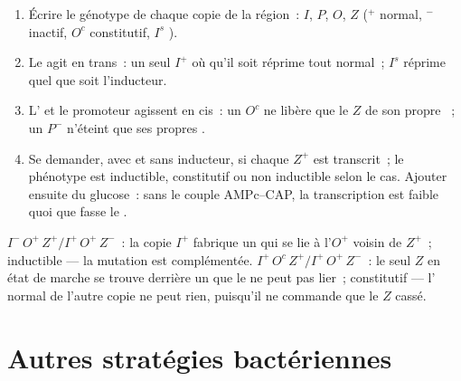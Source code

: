 \begin{method}\label{met:b1:expression-control:lacphenotype}
\begin{enumerate}
  \item Écrire le génotype de chaque copie de la région~: $I$, $P$, $O$,
        $Z$ ($^+$ normal, $^-$ inactif, $O^c$  constitutif,
        $I^s$ ).
  \item Le  agit en trans~: un seul $I^+$ où qu'il soit
        réprime tout  normal~; $I^s$ réprime quel que soit
        l'inducteur.
  \item L' et le promoteur agissent en cis~: un $O^c$ ne
        libère que le $Z$ de son propre ~; un $P^-$ n'éteint que ses
        propres .
  \item Se demander, avec et sans inducteur, si chaque  $Z^+$ est
        transcrit~; le phénotype est inductible, constitutif ou non
        inductible selon le cas. Ajouter ensuite du glucose~: sans le
        couple AMPc--CAP, la transcription est faible quoi que fasse le
        .
\end{enumerate}
\end{method}

\begin{example}\label{ex:b1:expression-control:diploids}
$I^-\,O^+\,Z^+ / I^+\,O^+\,Z^-$~: la copie $I^+$ fabrique un 
qui se lie à l'$O^+$ voisin de $Z^+$~; inductible --- la mutation est
complémentée. $I^+\,O^c\,Z^+ / I^+\,O^+\,Z^-$~: le seul $Z$ en état de
marche se trouve derrière un  que le  ne peut pas
lier~; constitutif --- l' normal de l'autre copie ne peut rien,
puisqu'il ne commande que le $Z$ cassé.
\end{example}

\section{Autres stratégies bactériennes}


